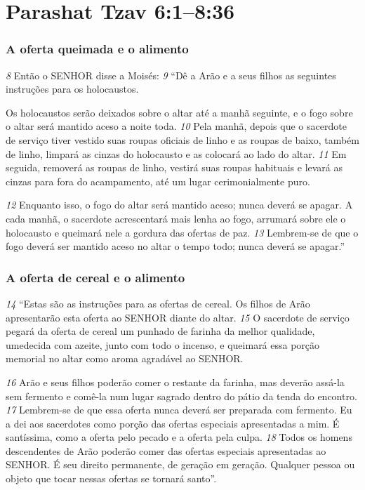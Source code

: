 \section*{Parashat Tzav 6:1–8:36}
\subsubsection*{A oferta queimada e o alimento}  
\textit{\tiny 8} 
Então o SENHOR disse a Moisés: 
\textit{\tiny 9} 
“Dê a Arão e a seus filhos as seguintes
instruções para os holocaustos. 

\smallskip
Os holocaustos serão deixados sobre o altar até a
manhã seguinte, e o fogo sobre o altar será mantido aceso a noite toda. 
\textit{\tiny 10}
Pela
manhã, depois que o sacerdote de serviço tiver vestido suas roupas oficiais de
linho e as roupas de baixo, também de linho, limpará as cinzas do holocausto e as
colocará ao lado do altar. 
\textit{\tiny 11}
Em seguida, removerá as roupas de linho, vestirá suas
roupas habituais e levará as cinzas para fora do acampamento, até um lugar
cerimonialmente puro. 

\smallskip
\textit{\tiny 12}
Enquanto isso, o fogo do altar será mantido aceso;
nunca deverá se apagar. A cada manhã, o sacerdote acrescentará mais lenha ao
fogo, arrumará sobre ele o holocausto e queimará nele a gordura das ofertas de
paz. 
\textit{\tiny 13}
Lembrem-se de que o fogo deverá ser mantido aceso no altar o tempo todo;
nunca deverá se apagar.”

\bigskip
\subsubsection*{A oferta de cereal e o alimento}  
\textit{\tiny 14}
“Estas são as instruções para as ofertas de cereal. Os filhos de Arão
apresentarão esta oferta ao SENHOR diante do altar. 
\textit{\tiny 15}
O sacerdote de serviço
pegará da oferta de cereal um punhado de farinha da melhor qualidade,
umedecida com azeite, junto com todo o incenso, e queimará essa porção
memorial no altar como aroma agradável ao SENHOR. 

\smallskip
\textit{\tiny 16}
Arão e seus filhos poderão
comer o restante da farinha, mas deverão assá-la sem fermento e comê-la num
lugar sagrado dentro do pátio da tenda do encontro. 
\textit{\tiny 17}
Lembrem-se de que essa
oferta nunca deverá ser preparada com fermento. Eu a dei aos sacerdotes como
porção das ofertas especiais apresentadas a mim. É santíssima, como a oferta pelo
pecado e a oferta pela culpa. 
\textit{\tiny 18}
Todos os homens descendentes de Arão poderão
comer das ofertas especiais apresentadas ao SENHOR. É seu direito permanente, de
geração em geração. Qualquer pessoa ou objeto que tocar nessas ofertas se
tornará santo”.

